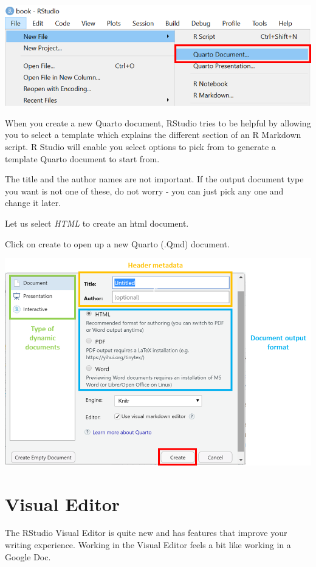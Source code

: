 \documentclass[
  letterpaper,
  DIV=11,
  numbers=noendperiod,
  oneside]{scrreprt}
\begin{document}
\includegraphics{./images/paste-A7DE8B60.png}

When you create a new Quarto document, RStudio tries to be helpful by
allowing you to select a template which explains the different section
of an R Markdown script. R Studio will enable you select options to pick
from to generate a template Quarto document to start from.

The title and the author names are not important. If the output document
type you want is not one of these, do not worry - you can just pick any
one and change it later.

Let us select \emph{HTML} to create an html document.

Click on create to open up a new Quarto (.Qmd) document.

\includegraphics{./images/paste-67B97E04.png}

\hypertarget{visual-editor}{%
\section{Visual Editor}\label{visual-editor}}

The RStudio Visual Editor is quite new and has features that improve
your writing experience. Working in the Visual Editor feels a bit like
working in a Google Doc.
\end{document}
